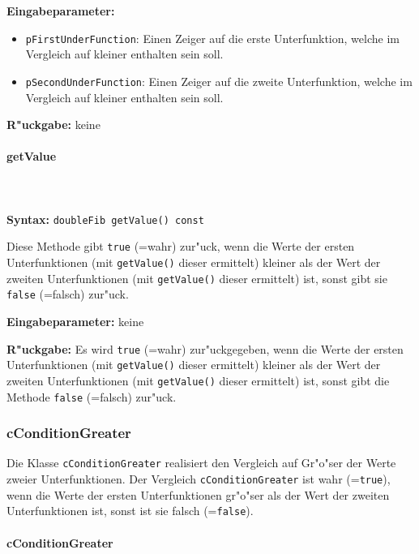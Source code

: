\bigskip\noindent
\textbf{Eingabeparameter:}
\begin{itemize}
 \item \verb|pFirstUnderFunction|: Einen Zeiger auf die erste Unterfunktion, welche im Vergleich auf kleiner enthalten sein soll.
 \item \verb|pSecondUnderFunction|: Einen Zeiger auf die zweite Unterfunktion, welche im Vergleich auf kleiner enthalten sein soll.
\end{itemize}

\bigskip\noindent
\textbf{R"uckgabe:} keine


\paragraph{getValue}

\ \\\\\noindent
\textbf{Syntax:} \verb|doubleFib getValue() const|

\bigskip\noindent
Diese Methode gibt \verb|true| (=wahr) zur"uck, wenn die Werte der ersten Unterfunktionen (mit \verb|getValue()| dieser ermittelt) kleiner als der Wert der zweiten Unterfunktionen (mit \verb|getValue()| dieser ermittelt) ist, sonst gibt sie \verb|false| (=falsch) zur"uck.

\bigskip\noindent
\textbf{Eingabeparameter:} keine

\bigskip\noindent
\textbf{R"uckgabe:} Es wird \verb|true| (=wahr) zur"uckgegeben, wenn die Werte der ersten Unterfunktionen (mit \verb|getValue()| dieser ermittelt) kleiner als der Wert der zweiten Unterfunktionen (mit \verb|getValue()| dieser ermittelt) ist, sonst gibt die Methode \verb|false| (=falsch) zur"uck.


\subsubsection{cConditionGreater}

Die Klasse \verb|cConditionGreater| realisiert den Vergleich auf Gr"o"ser der Werte zweier Unterfunktionen. Der Vergleich \verb|cConditionGreater| ist wahr (=\verb|true|), wenn die Werte der ersten Unterfunktionen gr"o"ser als der Wert der zweiten Unterfunktionen ist, sonst ist sie falsch  (=\verb|false|).


\paragraph{cConditionGreater}

